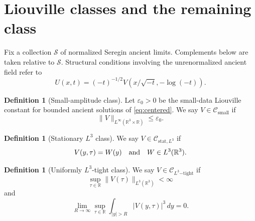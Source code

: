 \documentclass[11pt]{amsart}
\theoremstyle{plain}
\theoremstyle{definition}
\newtheorem{definition}[theorem]{Definition}
\theoremstyle{remark}
\numberwithin{equation}{section}
\newcommand{\R}{\mathbb R}
\newcommand{\calS}{\mathcal S}
\newcommand{\calC}{\mathcal C}
\begin{document}
\section{Liouville classes and the remaining class}\label{sec:classes}

Fix a collection \(\calS\) of normalized Seregin ancient limits.  Complements
below are taken relative to \(\calS\).  Structural conditions involving the
unrenormalized ancient field refer to
\[
   U(x,t)=(-t)^{-1/2}V(x/\sqrt{-t},-\log(-t)).
\]

\begin{definition}[Small-amplitude class]\label{def:small-class}
Let \(\varepsilon_0>0\) be the small-data Liouville constant for bounded
ancient solutions of \eqref{eq:centered}.  We say
\(V\in\calC_{\mathrm{small}}\) if
\[
   \|V\|_{L^\infty(\R^3\times\R)}\le \varepsilon_0.
\]
\end{definition}

\begin{definition}[Stationary \(L^3\) class]\label{def:stationary-class}
We say \(V\in\calC_{\mathrm{stat},L^3}\) if
\[
   V(y,\tau)=W(y)
   \quad\hbox{and}\quad
   W\in L^3(\R^3).
\]
\end{definition}

\begin{definition}[Uniformly \(L^3\)-tight class]\label{def:tight-class}
We say \(V\in\calC_{L^3\mathrm{-tight}}\) if
\begin{equation}\label{eq:L3-bound}
   \sup_{\tau\in\R}\|V(\tau)\|_{L^3(\R^3)}<\infty
\end{equation}
and
\begin{equation}\label{eq:L3-tightness}
   \lim_{R\to\infty}
   \sup_{\tau\in\R}\int_{|y|>R}|V(y,\tau)|^3\,dy=0 .
\end{equation}
\end{definition}
\end{document}
